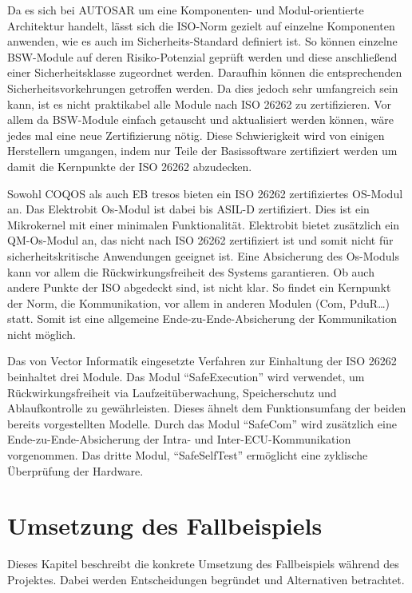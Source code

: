 \documentclass[
  a4paper,					    %
  twoside,
  DIV=calc,     				%
  bibliography=totoc,
  cleardoublepage=empty,
  ngerman,     					%
  final       					%
]{scrbook}
\begin{document}
Da es sich bei AUTOSAR um eine Komponenten- und Modul-orientierte Architektur handelt, lässt sich die ISO-Norm gezielt auf einzelne Komponenten anwenden, wie es auch im Sicherheits-Standard definiert ist. So können einzelne BSW-Module auf deren Risiko-Potenzial geprüft werden und diese anschließend einer Sicherheitsklasse zugeordnet werden. Daraufhin können die entsprechenden Sicherheitsvorkehrungen getroffen werden. Da dies jedoch sehr umfangreich sein kann, ist es nicht praktikabel alle Module nach ISO 26262 zu zertifizieren. Vor allem da BSW-Module einfach getauscht und aktualisiert werden können, wäre jedes mal eine neue Zertifizierung nötig. Diese Schwierigkeit wird von einigen Herstellern umgangen, indem nur Teile der Basissoftware zertifiziert werden um damit die Kernpunkte der ISO 26262 abzudecken.

Sowohl COQOS als auch EB tresos bieten ein ISO 26262 zertifiziertes OS-Modul an.\cite{eb_tresos}\cite{coqos} Das Elektrobit Os-Modul ist dabei bis ASIL-D zertifiziert. Dies ist ein Mikrokernel mit einer minimalen Funktionalität. Elektrobit bietet zusätzlich ein QM-Os-Modul an, das nicht nach ISO 26262 zertifiziert ist und somit nicht für sicherheitskritische Anwendungen geeignet ist. Eine Absicherung des Os-Moduls kann vor allem die Rückwirkungsfreiheit des Systems garantieren. Ob auch andere Punkte der ISO abgedeckt sind, ist nicht klar. So findet ein Kernpunkt der Norm, die Kommunikation, vor allem in anderen Modulen (Com, PduR\dots) statt. Somit ist eine allgemeine Ende-zu-Ende-Absicherung der Kommunikation nicht möglich.

Das von Vector Informatik eingesetzte Verfahren zur Einhaltung der ISO 26262 beinhaltet drei Module.\cite{microsar} Das Modul "`SafeExecution"' wird verwendet, um Rückwirkungsfreiheit via Laufzeitüberwachung, Speicherschutz und Ablaufkontrolle zu gewährleisten. Dieses ähnelt dem Funktionsumfang der beiden bereits vorgestellten Modelle. Durch das Modul "`SafeCom"' wird zusätzlich eine Ende-zu-Ende-Absicherung der Intra- und Inter-ECU-Kommunikation vorgenommen. Das dritte Modul, "`SafeSelfTest"' ermöglicht eine zyklische Überprüfung der Hardware.









\chapter{Umsetzung des Fallbeispiels}
\label{sec:Umsetzung_Fallbeispiel}
Dieses Kapitel beschreibt die konkrete Umsetzung des Fallbeispiels während des Projektes. Dabei werden Entscheidungen begründet und Alternativen betrachtet.
\end{document}
